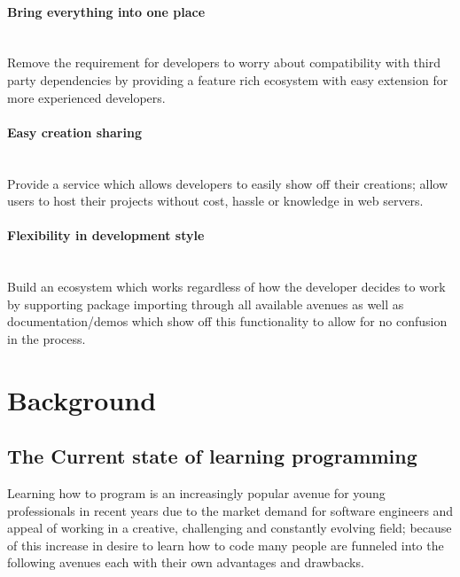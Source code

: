 \documentclass{l4proj}
\begin{document}
\subsubsection{Bring everything into one place} \hfill\\
\text Remove the requirement for developers to worry about compatibility with third party dependencies by providing a feature rich ecosystem with easy extension for more experienced developers.
\\
\subsubsection{Easy creation sharing}\hfill\\
\text Provide a service which allows developers to easily show off their creations; allow users to host their projects without cost, hassle or knowledge in web servers.
\\
\subsubsection{Flexibility in development style}\hfill\\
\text Build an ecosystem which works regardless of how the developer decides to work by supporting package importing through all available avenues as well as documentation/demos which show off this functionality to allow for no confusion in the process.
\\


\chapter{Background}

\section{The Current state of learning programming}

Learning how to program is an increasingly popular avenue for young professionals in recent years due to the market demand for software engineers and appeal of working in a creative, challenging and constantly evolving field; because of this increase in desire to learn how to code many people are funneled into the following avenues each with their own advantages and drawbacks.
\end{document}
